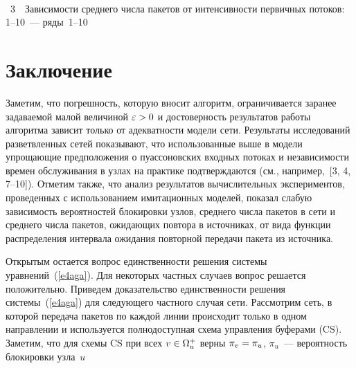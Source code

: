     \begin{multicols}{2}


\noindent
\begin{center} %
\vspace*{1pt}
\mbox{%
   \epsfxsize=77.808mm
}
\end{center}
\vspace*{3pt}
{{\figurename~3}\ \ \small{Зависимости среднего числа пакетов от интенсивности 
первичных потоков: 1--10~--- ряды~1--10}}
\vspace*{10pt}

\addtocounter{figure}{1}

     


\section{Заключение}

     Заметим, что погрешность, которую вносит алгоритм, ограничивается 
заранее задаваемой малой величиной $\varepsilon \hm>0$ и достоверность 
результатов работы алгоритма зависит только от адекватности модели сети. 
Результаты исследований разветвленных сетей показывают, что 
использованные выше в модели упрощающие предположения о 
пуассоновских входных потоках и независимости времен обслуживания в 
узлах на практике подтверждаются (см., например,~[3, 4, 7--10]). 
Отметим также, что анализ результатов вычислительных 
экспериментов, проведенных с использованием имитационных моделей, 
показал слабую зависимость вероятностей блокировки узлов, среднего числа 
пакетов в сети и среднего числа пакетов, ожидающих повтора в источниках, 
от вида функции распределения интервала ожидания повторной передачи 
пакета из источника. 

Открытым остается вопрос единственности решения системы 
уравнений~(\ref{e4aga}). Для некоторых частных случаев вопрос решается 
положительно. Приведем доказательство единственности решения 
системы~(\ref{e4aga}) для следующего частного случая сети. Рассмотрим 
сеть, в которой передача пакетов по каждой линии происходит только в 
одном на\-прав\-ле\-нии и используется полнодоступная схема управ\-ле\-ния 
буферами (CS). Заметим, что для схемы CS при всех $v\hm\in\Omega_u^+$ 
верны $\pi_v\hm=\pi_u$, $\pi_u$~--- вероятность блокировки узла~$u$


\end{multicols}
